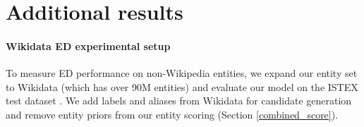 \documentclass[11pt]{article}
\begin{document}
\begin{table}[h]
\caption{Our model hyperparameters}
\label{tab:hyperparams}
\end{table}




\section{Additional results}
\label{sec:additional_results}

\paragraph{Wikidata ED experimental setup}
To measure ED performance on non-Wikipedia entities, we expand our entity set to Wikidata (which has over 90M entities) and evaluate our model on the ISTEX test dataset \citep{delpeuch2020opentapioca}. We add labels and aliases from Wikidata for candidate generation and remove entity priors from our entity scoring (Section \ref{combined_score}). 
\end{document}
